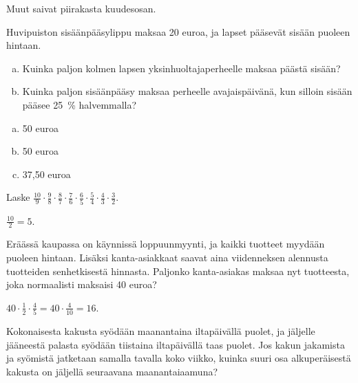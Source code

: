 \begin{tehtavasivu}
\begin{tehtava}
        \begin{vastaus}
            Muut saivat piirakasta kuudesosan.
        \end{vastaus}
    \end{tehtava}
    
    \begin{tehtava} %
        Huvipuiston sisäänpääsylippu maksaa 20 euroa, ja lapset pääsevät
        sisään puoleen hintaan.
	\begin{enumerate}[a)]
		\item Kuinka paljon kolmen lapsen yksinhuoltajaperheelle maksaa päästä sisään?
		\item Kuinka paljon sisäänpääsy maksaa perheelle avajaispäivänä,
		kun silloin sisään pääsee 25~\% halvemmalla?
        \end{enumerate}
        \begin{vastaus}
	\begin {enumerate}[a)]
         \item 50 euroa 
           \item 50 euroa 
	\item 37,50 euroa
\end{enumerate} 
       \end{vastaus}
    \end{tehtava}  
  
    \begin{tehtava}
        Laske 
        $\frac{10}{9}\cdot \frac{9}{8}\cdot \frac{8}{7}\cdot \frac{7}{6}\cdot \frac{6}{5}
            \cdot \frac{5}{4}\cdot \frac{4}{3}\cdot \frac{3}{2}$.
        
        \begin{vastaus}
            $\frac{10}{2}=5$.
        \end{vastaus}        
    \end{tehtava}
    
    \begin{tehtava}
    	Eräässä kaupassa on käynnissä loppuunmyynti, ja kaikki tuotteet
        myydään puoleen hintaan. Lisäksi kanta-asiakkaat saavat aina
        viidenneksen alennusta tuotteiden senhetkisestä hinnasta.
    	Paljonko kanta-asiakas maksaa nyt tuotteesta, joka normaalisti
        maksaisi 40 euroa?
    	\begin{vastaus}
    	$40\cdot \frac{1}{2} \cdot \frac{4}{5}=40\cdot \frac{4}{10}= 16$. 
    	\end{vastaus}
    \end{tehtava}
    
    \begin{tehtava}
        Kokonaisesta kakusta syödään maanantaina iltapäivällä puolet, ja jäljelle
        jääneestä palasta syödään tiistaina iltapäivällä taas puolet.
        Jos kakun jakamista ja syömistä jatketaan samalla tavalla koko viikko,
        kuinka suuri osa alkuperäisestä kakusta on
        jäljellä seuraavana maanantaiaamuna?
        

\end{tehtava}
\end{tehtavasivu}
